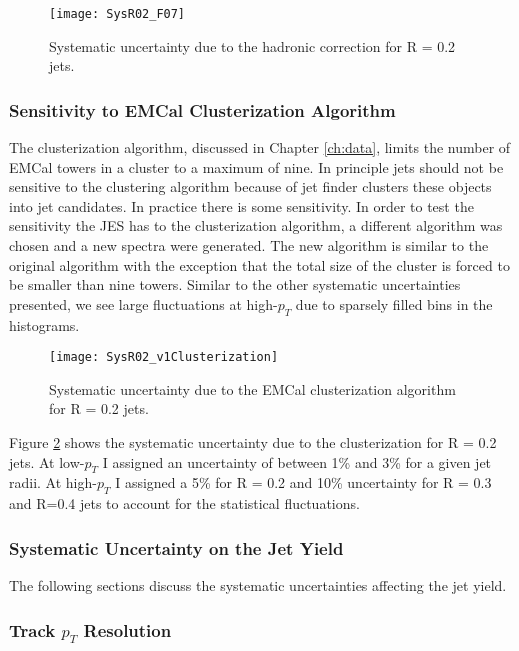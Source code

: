 \begin{figure}[t!]
\texttt{[image: SysR02\_F07]}
\centering
\caption{Systematic uncertainty due to the hadronic correction for R = 0.2 jets.}
\label{fig:hadeff}
\end{figure}

\subsubsection{Sensitivity to EMCal Clusterization Algorithm}
The clusterization algorithm, discussed in Chapter \ref{ch:data}, limits the number of EMCal towers in a cluster to a maximum of nine.  In principle jets should not be sensitive to the clustering algorithm because of jet finder clusters these objects into jet candidates. In practice there is some sensitivity.  In order to test the sensitivity the JES has to the clusterization algorithm, a different algorithm was chosen and a new spectra were generated.  The new algorithm is similar to the original algorithm with the exception that the total size of the cluster is forced to be smaller than nine towers.  Similar to the other systematic uncertainties presented, we see large fluctuations at high-$p_{T}$ due to sparsely filled bins in the histograms.  

\begin{figure}[t!]
\texttt{[image: SysR02\_v1Clusterization]}
\centering
\caption{Systematic uncertainty due to the EMCal clusterization algorithm for R = 0.2 jets.}
\label{fig:cluseff}
\end{figure}


Figure \ref{fig:cluseff} shows the systematic uncertainty due to the clusterization for R = 0.2 jets.  At low-$p_{T}$ I assigned an uncertainty of between 1\% and 3\% for a given jet radii.  At high-$p_{T}$ I assigned a 5\% for R = 0.2 and 10\% uncertainty for R = 0.3 and R=0.4 jets to account for the statistical fluctuations.

\subsubsection{Systematic Uncertainty on the Jet Yield}

The following sections discuss the systematic uncertainties affecting the jet yield.

\subsubsection{Track $p_{T}$ Resolution}




